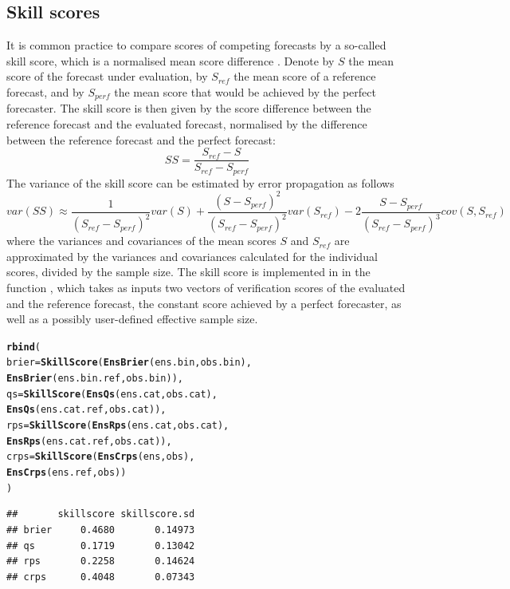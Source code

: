 \documentclass[article]{jss}\usepackage{graphicx, color}
\makeatletter
\newcommand{\hlfunctioncall}[1]{\textcolor[rgb]{0,0.501960784313725,0.752941176470588}{\textbf{#1}}}%
\newenvironment{kframe}{%
 \def\at@end@of@kframe{}%
 \ifinner\ifhmode%
  \def\at@end@of@kframe{\end{minipage}}%
  \begin{minipage}{\columnwidth}%
 \fi\fi%
 \def\FrameCommand##1{\hskip\@totalleftmargin \hskip-\fboxsep
 \colorbox{shadecolor}{##1}\hskip-\fboxsep
     \hskip-\linewidth \hskip-\@totalleftmargin \hskip\columnwidth}%
 \MakeFramed {\advance\hsize-\width
   \@totalleftmargin\z@ \linewidth\hsize
   \@setminipage}}%
 {\par\unskip\endMakeFramed%
 \at@end@of@kframe}
\newenvironment{knitrout}{}{} %
\makeatother
\begin{document}
\subsection{Skill scores}

It is common practice to compare scores of competing forecasts by a so-called skill score, which is a normalised mean score difference \citep{wilks2011statistical}.
Denote by $S$ the mean score of the forecast under evaluation, by $S_{ref}$ the mean score of a reference forecast, and by $S_{perf}$ the mean score that would be achieved by the perfect forecaster.
The skill score is then given by the score difference between the reference forecast and the evaluated forecast, normalised by the difference between the reference forecast and the perfect forecast:
%
\begin{equation}
SS = \frac{S_{ref} - S}{S_{ref} - S_{perf}}
\end{equation}
%
The variance of the skill score can be estimated by error propagation as follows
%
\begin{equation}
var(SS) \approx \frac{1}{(S_{ref} - S_{perf})^2} var(S) + \frac{(S - S_{perf})^2}{(S_{ref}-S_{perf})^2} var(S_{ref}) - 2 \frac{S-S_{perf}}{(S_{ref}-S_{perf})^3} cov(S, S_{ref})
\end{equation}
%
where the variances and covariances of the mean scores $S$ and $S_{ref}$ are approximated by the variances and covariances calculated for the individual scores, divided by the sample size.
The skill score is implemented in  in the function , which takes as inputs two vectors of verification scores of the evaluated and the reference forecast, the constant score achieved by a perfect forecaster, as well as a possibly user-defined effective sample size.


\begin{knitrout}
\color{fgcolor}\begin{kframe}
\begin{alltt}
\hlfunctioncall{rbind}(
  brier = \hlfunctioncall{SkillScore}(\hlfunctioncall{EnsBrier}(ens.bin, obs.bin), 
                     \hlfunctioncall{EnsBrier}(ens.bin.ref, obs.bin)),
  qs    = \hlfunctioncall{SkillScore}(\hlfunctioncall{EnsQs}(ens.cat, obs.cat),    
                     \hlfunctioncall{EnsQs}(ens.cat.ref, obs.cat)),
  rps   = \hlfunctioncall{SkillScore}(\hlfunctioncall{EnsRps}(ens.cat, obs.cat),   
                     \hlfunctioncall{EnsRps}(ens.cat.ref, obs.cat)),
  crps  = \hlfunctioncall{SkillScore}(\hlfunctioncall{EnsCrps}(ens, obs),          
                     \hlfunctioncall{EnsCrps}(ens.ref, obs))
)
\end{alltt}
\begin{verbatim}
##       skillscore skillscore.sd
## brier     0.4680       0.14973
## qs        0.1719       0.13042
## rps       0.2258       0.14624
## crps      0.4048       0.07343
\end{verbatim}
\end{kframe}
\end{knitrout}
\end{document}

